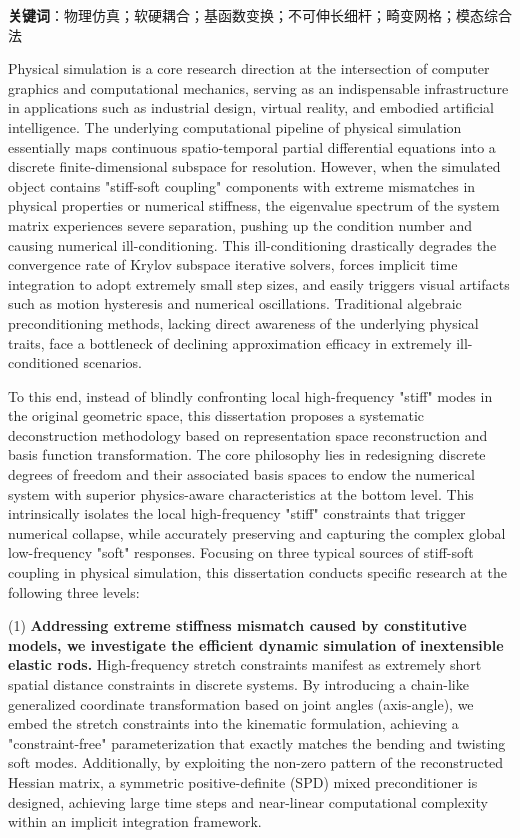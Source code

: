\bigskip
\noindent \textbf{关键词}：物理仿真；软硬耦合；基函数变换；不可伸长细杆；畸变网格；模态综合法

\cleardoublepage
{}

Physical simulation is a core research direction at the intersection of computer graphics and computational mechanics, serving as an indispensable infrastructure in applications such as industrial design, virtual reality, and embodied artificial intelligence. The underlying computational pipeline of physical simulation essentially maps continuous spatio-temporal partial differential equations into a discrete finite-dimensional subspace for resolution. However, when the simulated object contains "stiff-soft coupling" components with extreme mismatches in physical properties or numerical stiffness, the eigenvalue spectrum of the system matrix experiences severe separation, pushing up the condition number and causing numerical ill-conditioning. This ill-conditioning drastically degrades the convergence rate of Krylov subspace iterative solvers, forces implicit time integration to adopt extremely small step sizes, and easily triggers visual artifacts such as motion hysteresis and numerical oscillations. Traditional algebraic preconditioning methods, lacking direct awareness of the underlying physical traits, face a bottleneck of declining approximation efficacy in extremely ill-conditioned scenarios.

To this end, instead of blindly confronting local high-frequency "stiff" modes in the original geometric space, this dissertation proposes a systematic deconstruction methodology based on representation space reconstruction and basis function transformation. The core philosophy lies in redesigning discrete degrees of freedom and their associated basis spaces to endow the numerical system with superior physics-aware characteristics at the bottom level. This intrinsically isolates the local high-frequency "stiff" constraints that trigger numerical collapse, while accurately preserving and capturing the complex global low-frequency "soft" responses. Focusing on three typical sources of stiff-soft coupling in physical simulation, this dissertation conducts specific research at the following three levels:

(1) \textbf{Addressing extreme stiffness mismatch caused by constitutive models, we investigate the efficient dynamic simulation of inextensible elastic rods.} High-frequency stretch constraints manifest as extremely short spatial distance constraints in discrete systems. By introducing a chain-like generalized coordinate transformation based on joint angles (axis-angle), we embed the stretch constraints into the kinematic formulation, achieving a "constraint-free" parameterization that exactly matches the bending and twisting soft modes. Additionally, by exploiting the non-zero pattern of the reconstructed Hessian matrix, a symmetric positive-definite (SPD) mixed preconditioner is designed, achieving large time steps and near-linear computational complexity within an implicit integration framework.

